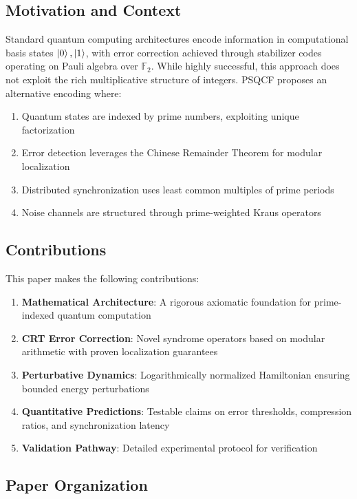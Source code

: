 \documentclass[12pt,a4paper]{article}
\begin{document}
\subsection{Motivation and Context}

Standard quantum computing architectures encode information in computational basis states $\ket{0}, \ket{1}$, with error correction achieved through stabilizer codes operating on Pauli algebra over $\mathbb{F}_2$. While highly successful, this approach does not exploit the rich multiplicative structure of integers. PSQCF proposes an alternative encoding where:

\begin{enumerate}[label=(\roman*)]
    \item Quantum states are indexed by prime numbers, exploiting unique factorization
    \item Error detection leverages the Chinese Remainder Theorem for modular localization
    \item Distributed synchronization uses least common multiples of prime periods
    \item Noise channels are structured through prime-weighted Kraus operators
\end{enumerate}

\subsection{Contributions}

This paper makes the following contributions:

\begin{enumerate}
    \item \textbf{Mathematical Architecture}: A rigorous axiomatic foundation for prime-indexed quantum computation
    \item \textbf{CRT Error Correction}: Novel syndrome operators based on modular arithmetic with proven localization guarantees
    \item \textbf{Perturbative Dynamics}: Logarithmically normalized Hamiltonian ensuring bounded energy perturbations
    \item \textbf{Quantitative Predictions}: Testable claims on error thresholds, compression ratios, and synchronization latency
    \item \textbf{Validation Pathway}: Detailed experimental protocol for verification
\end{enumerate}

\subsection{Paper Organization}
\end{document}
